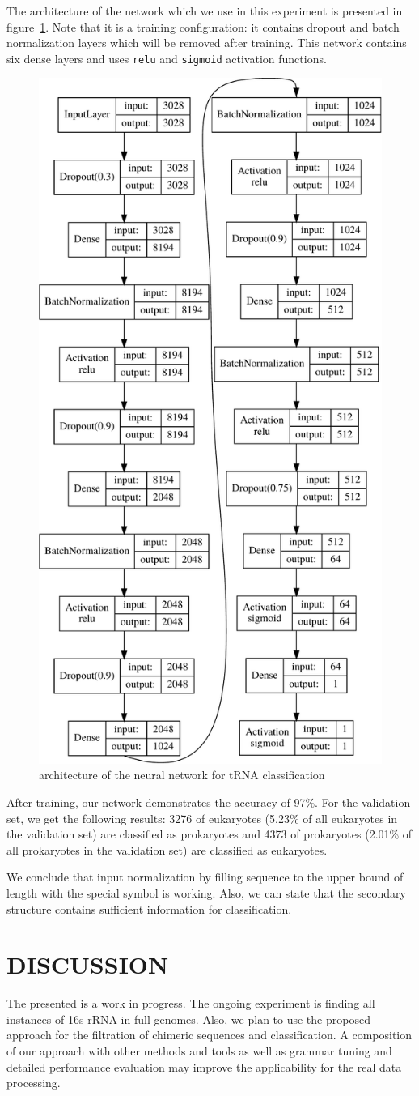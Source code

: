 \documentclass[a4paper,twoside]{article}
\begin{document}
The architecture of the network which we use in this experiment is presented in figure~\ref{fig:nn}.
Note that it is a training configuration: it contains dropout and batch normalization layers which will be removed after training.
This network contains six dense layers and uses \verb|relu| and \verb|sigmoid| activation functions.

\begin{figure}
\centering
\includegraphics[width=.4\textwidth]{figures/model-crop.pdf}
\caption{architecture of the neural network for tRNA classification}
\label{fig:nn}
\end{figure}

After training, our network demonstrates the accuracy of 97\%. 
For the validation set, we get the following results: 3276 of eukaryotes (5.23\% of all eukaryotes in the validation set) are classified as prokaryotes and 4373 of prokaryotes (2.01\% of all prokaryotes in the validation set) are classified as eukaryotes. 

We conclude that input normalization by filling sequence to the upper bound of length with the special symbol is working.
Also, we can state that the secondary structure contains sufficient information for classification.


\section{\uppercase{Discussion}}
\label{sec:Discussion}

\noindent The presented is a work in progress. 
The ongoing experiment is finding all instances of 16s rRNA in full genomes.
Also, we plan to use the proposed approach for the filtration of chimeric sequences and classification.
A composition of our approach with other methods and tools as well as grammar tuning and detailed performance evaluation may improve the applicability for the real data processing.
\end{document}
